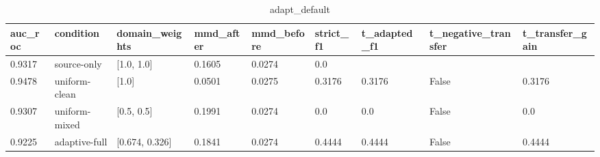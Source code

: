 \begin{table}[h]
\centering
\caption{adapt_default}
\label{tab:adapt_default}
\begin{tabular}{lllllllll}
\toprule
auc\_roc & condition & domain\_weights & mmd\_after & mmd\_before & strict\_f1 & t\_adapted\_f1 & t\_negative\_transfer & t\_transfer\_gain \\
\midrule
0.9317 & source-only & [1.0, 1.0] & 0.1605 & 0.0274 & 0.0 &  &  &  \\
0.9478 & uniform-clean & [1.0] & 0.0501 & 0.0275 & 0.3176 & 0.3176 & False & 0.3176 \\
0.9307 & uniform-mixed & [0.5, 0.5] & 0.1991 & 0.0274 & 0.0 & 0.0 & False & 0.0 \\
0.9225 & adaptive-full & [0.674, 0.326] & 0.1841 & 0.0274 & 0.4444 & 0.4444 & False & 0.4444 \\
\bottomrule
\end{tabular}
\end{table}
